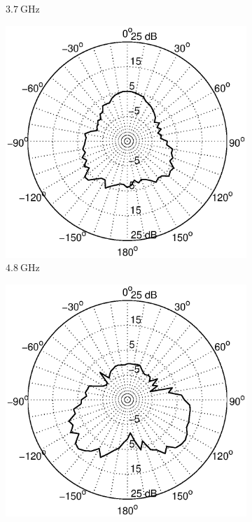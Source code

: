 \documentclass[a4paper]{article}        %
\begin{document}
\begin{figure}[H]
\begin{subfigure}{0.5\textwidth}
			\caption{$\SI{3.7}{\giga\hertz}$}
		\end{subfigure}
		\begin{subfigure}{0.5\textwidth}
			\includegraphics[width=\textwidth]{images/antenna/radpat_azi_4_8G.eps}
			\caption{$\SI{4.8}{\giga\hertz}$}
		\end{subfigure}
		\begin{subfigure}{0.5\textwidth}
			\includegraphics[width=\textwidth]{images/antenna/radpat_azi_5G.eps}

\end{subfigure}
\end{figure}
\end{document}
